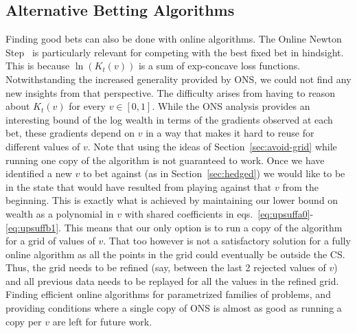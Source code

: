 \subsection{Alternative Betting Algorithms}
Finding good bets can also be done with online algorithms.
The Online Newton Step~\cite{hazan2007logarithmic}
is particularly relevant for competing 
with the best fixed bet in hindsight. This
is because $\ln(K_t(v))$ is a sum of exp-concave
loss functions. Notwithstanding the increased
generality provided by ONS, we 
could not find any new insights from that
perspective. The difficulty arises from 
having to reason about $K_t(v)$ for every 
$v \in [0,1]$. While the ONS analysis 
provides an interesting bound of the 
log wealth in terms of the gradients
observed at each bet, these gradients 
depend on $v$ in a way that makes it 
hard to reuse for different values of $v$.
Note that using 
the ideas of Section~\ref{sec:avoid-grid}
while running one copy of the algorithm 
is not guaranteed to work. Once we have identified
a new $v$ to bet against (as in 
Section~\ref{sec:hedged}) we would 
like to be in the state that 
would have resulted from playing against
that $v$ from the beginning. This is 
exactly what is achieved by maintaining 
our lower bound on wealth as a polynomial
in $v$ with shared coefficients in 
eqs.~\eqref{eq:upsuffa0}-\eqref{eq:upsuffb1}.
This means that our only option is 
to run a copy of the algorithm for a grid
of values of $v$. That too however is 
not a satisfactory solution for a fully 
online algorithm as all the points in 
the grid could eventually be outside the
CS. Thus, the grid needs to be 
refined (say, between the last 2 
rejected values of $v$) and 
all previous data needs to be replayed for all
the values in the refined grid. Finding 
efficient online algorithms 
for parametrized families of
problems, and providing conditions where a single 
copy of ONS is almost as good as running
a copy per $v$ are left for future work.

